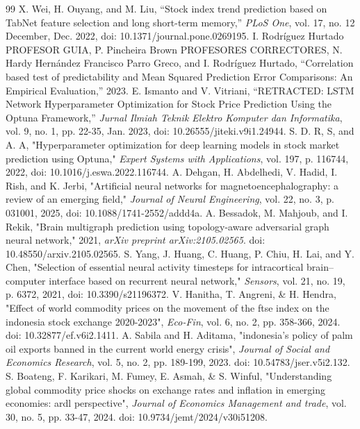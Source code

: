 \documentclass[conference]{IEEEtran}
\begin{document}
\begin{thebibliography}{99}
   X. Wei, H. Ouyang, and M. Liu, “Stock index trend prediction based on TabNet feature selection and long short-term memory,” \textit{PLoS One}, vol. 17, no. 12 December, Dec. 2022, doi: 10.1371/journal.pone.0269195.
   I. Rodríguez Hurtado PROFESOR GUIA, P. Pincheira Brown PROFESORES CORRECTORES, N. Hardy Hernández Francisco Parro Greco, and I. Rodríguez Hurtado, “Correlation based test of predictability and Mean Squared Prediction Error Comparisons: An Empirical Evaluation,” 2023.
   E. Ismanto and V. Vitriani, “RETRACTED: LSTM Network Hyperparameter Optimization for Stock Price Prediction Using the Optuna Framework,” \textit{Jurnal Ilmiah Teknik Elektro Komputer dan Informatika}, vol. 9, no. 1, pp. 22-35, Jan. 2023, doi: 10.26555/jiteki.v9i1.24944.
   S. D. R, S, and A. A, "Hyperparameter optimization for deep learning models in stock market prediction using Optuna," \textit{Expert Systems with Applications}, vol. 197, p. 116744, 2022, doi: 10.1016/j.eswa.2022.116744.
   A. Dehgan, H. Abdelhedi, V. Hadid, I. Rish, and K. Jerbi, "Artificial neural networks for magnetoencephalography: a review of an emerging field," \textit{Journal of Neural Engineering}, vol. 22, no. 3, p. 031001, 2025, doi: 10.1088/1741-2552/addd4a.
   A. Bessadok, M. Mahjoub, and I. Rekik, "Brain multigraph prediction using topology-aware adversarial graph neural network," 2021, \textit{arXiv preprint arXiv:2105.02565}. doi: 10.48550/arxiv.2105.02565.
   S. Yang, J. Huang, C. Huang, P. Chiu, H. Lai, and Y. Chen, "Selection of essential neural activity timesteps for intracortical brain–computer interface based on recurrent neural network," \textit{Sensors}, vol. 21, no. 19, p. 6372, 2021, doi: 10.3390/s21196372.
   V. Hanitha, T. Angreni, \& H. Hendra, "Effect of world commodity prices on the movement of the ftse index on the indonesia stock exchange 2020-2023", \textit{Eco-Fin}, vol. 6, no. 2, pp. 358-366, 2024. doi: 10.32877/ef.v6i2.1411.
   A. Sabila and H. Aditama, "indonesia's policy of palm oil exports banned in the current world energy crisis", \textit{Journal of Social and Economics Research}, vol. 5, no. 2, pp. 189-199, 2023. doi: 10.54783/jser.v5i2.132.
   S. Boateng, F. Karikari, M. Fumey, E. Asmah, \& S. Winful, "Understanding global commodity price shocks on exchange rates and inflation in emerging economies: ardl perspective", \textit{Journal of Economics Management and trade}, vol. 30, no. 5, pp. 33-47, 2024. doi: 10.9734/jemt/2024/v30i51208.

\end{thebibliography}
\end{document}
